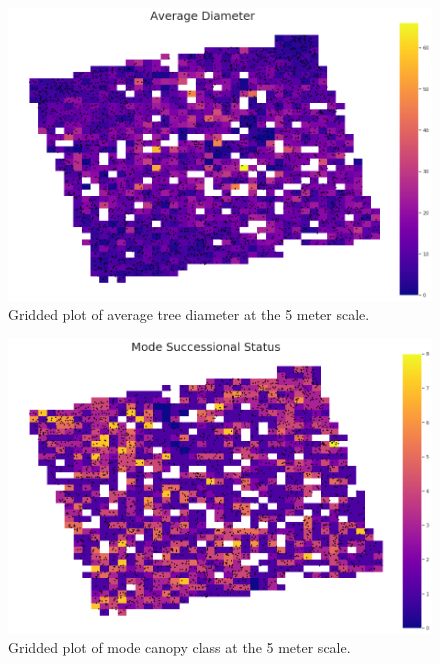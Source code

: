 \documentclass[12pt,a4paper]{article}
\begin{document}
\begin{figure}[H]
\centering
\includegraphics[scale=.45]{../figures/ESDA_dbh.png}
\caption{Gridded plot of average tree diameter at the 5 meter scale.}
\label{ESDA_dbh} 
\end{figure}

\begin{figure}[H]
\centering
\includegraphics[scale=.45]{../figures/ESDA_cnpy.png}
\caption{Gridded plot of mode canopy class at the 5 meter scale.}
\label{ESDA_cnpy} 
\end{figure}
\end{document}
